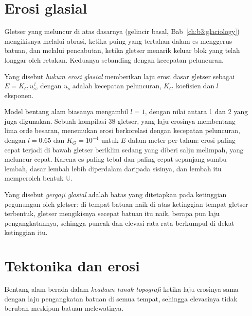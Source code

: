 \section{Erosi glasial}\label{sec:b3:quantitative-geomorphology:glacial}

Gletser yang meluncur di atas dasarnya (gelincir basal,
Bab~\ref{ch:b3:glaciology}) mengikisnya melalui abrasi, ketika puing yang tertahan dalam
es menggerus batuan, dan melalui pencabutan, ketika gletser menarik keluar blok yang telah longgar
oleh retakan. Keduanya sebanding dengan kecepatan peluncuran.

\begin{definition}\label{def:b3:quantitative-geomorphology:glacial}
Yang disebut \emph{hukum erosi glasial} memberikan laju
erosi dasar gletser sebagai $E = K_G\,u_s^{\,l}$, dengan $u_s$ adalah
kecepatan peluncuran, $K_G$ koefisien dan $l$ eksponen.
\end{definition}

Model bentang alam biasanya mengambil $l = 1$, dengan nilai antara 1 dan 2 yang juga digunakan.
Sebuah kompilasi 38 gletser, yang laju erosinya membentang lima orde
besaran, menemukan erosi berkorelasi dengan kecepatan peluncuran, dengan $l = 0.65$ dan
$K_G = 10^{-4}$ untuk $E$ dalam meter per tahun: erosi paling cepat terjadi di bawah gletser beriklim sedang
yang diberi salju melimpah, yang meluncur cepat. Karena es paling tebal
dan paling cepat sepanjang sumbu lembah, dasar lembah lebih diperdalam daripada
sisinya, dan lembah itu memperoleh bentuk U.

\begin{definition}\label{def:b3:quantitative-geomorphology:buzzsaw}
Yang disebut \emph{gergaji glasial} adalah batas yang ditetapkan pada
ketinggian pegunungan oleh gletser: di tempat batuan naik di atas ketinggian
tempat gletser terbentuk, gletser mengikisnya secepat batuan itu naik, berapa pun
laju pengangkatannya, sehingga puncak dan elevasi rata-rata berkumpul di dekat ketinggian itu.
\end{definition}

\section{Tektonika dan erosi}\label{sec:b3:quantitative-geomorphology:tectonics}

\begin{definition}\label{def:b3:quantitative-geomorphology:steady-state}
Bentang alam berada dalam \emph{keadaan tunak topografi}
ketika laju erosinya sama dengan laju pengangkatan batuan di semua tempat, sehingga
elevasinya tidak berubah meskipun batuan melewatinya.
\end{definition}

